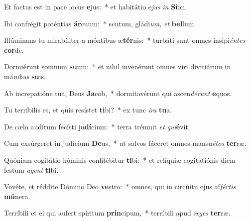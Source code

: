 \item Et factus est in pace locus \textbf{e}jus:~* et habitátio e\myhspace\textit{jus} \textit{in} \textbf{Si}on.
\item Ibi confrégit poténtias \textbf{ár}cuum:~* scutum, gládi\textit{um,} \textit{et} \textbf{bel}lum.
\item Illúminans tu mirabíliter a móntibus æ\textbf{tér}nis:~* turbáti sunt omnes insipi\textit{éntes} \textbf{cor}de.
\item Dormiérunt somnum \textbf{su}um:~* et nihil invenérunt omnes viri divitiárum in má\textit{nibus} \textbf{su}is.
\item Ab increpatióne tua, Deus \textbf{Ja}cob,~* dormitavérunt qui ascen\textit{dérunt} \textbf{e}quos.
\item Tu terríbilis es, et quis resístet \textbf{ti}bi?~* ex tunc \textit{ira} \textbf{tu}a.
\item De cælo audítum fecísti ju\textbf{dí}cium:~* terra trémuit \textit{et} \textit{qui}\hspace*{-0.02em}\textbf{é}vit.
\item Cum exsúrgeret in judícium \textbf{De}us,~* ut salvos fáceret omnes mansu\hspace*{0.02em}\textit{étos} \textbf{ter}ræ.
\item Quóniam cogitátio hóminis confitébitur \textbf{ti}bi:~* et relíquiæ cogitatiónis diem festum \textit{agent} \textbf{ti}bi.
\item Vovéte, et réddite Dómino Deo \textbf{ve}stro:~* omnes, qui in circúitu ejus af\textit{fértis} \textbf{mú}nera.
\item Terríbili et ei qui aufert spíritum \textbf{prín}cipum,~* terríbili apud \textit{reges} \textbf{ter}ræ.
